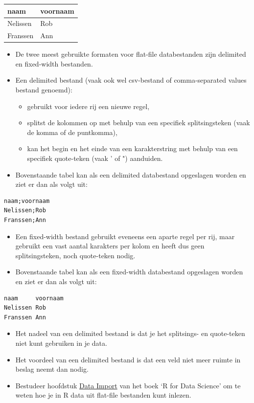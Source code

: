 \documentclass[]{tufte-book}
\providecommand{\tightlist}{%
  \setlength{\itemsep}{0pt}\setlength{\parskip}{0pt}}
\begin{document}
\begin{longtable}[]{@{}ll@{}}
\toprule
naam & voornaam\tabularnewline
\midrule
\endhead
Nelissen & Rob\tabularnewline
Franssen & Ann\tabularnewline
\bottomrule
\end{longtable}

\begin{itemize}
\tightlist
\item
  De twee meest gebruikte formaten voor flat-file databestanden zijn delimited en fixed-width bestanden.
\item
  Een delimited bestand (vaak ook wel csv-bestand of comma-separated values bestand genoemd):

  \begin{itemize}
  \tightlist
  \item
    gebruikt voor iedere rij een nieuwe regel,
  \item
    splitst de kolommen op met behulp van een specifiek splitsingsteken (vaak de komma of de puntkomma),
  \item
    kan het begin en het einde van een karakterstring met behulp van een specifiek quote-teken (vaak ' of ") aanduiden.
  \end{itemize}
\item
  Bovenstaande tabel kan als een delimited databestand opgeslagen worden en ziet er dan als volgt uit:
\end{itemize}

\begin{verbatim}
naam;voornaam
Nelissen;Rob
Franssen;Ann
\end{verbatim}

\begin{itemize}
\tightlist
\item
  Een fixed-width bestand gebruikt eveneens een aparte regel per rij, maar gebruikt een vast aantal karakters per kolom en heeft dus geen splitsingsteken, noch quote-teken nodig.
\item
  Bovenstaande tabel kan als een fixed-width databestand opgeslagen worden en ziet er dan als volgt uit:
\end{itemize}

\begin{verbatim}
naam     voornaam
Nelissen Rob
Franssen Ann
\end{verbatim}

\begin{itemize}
\tightlist
\item
  Het nadeel van een delimited bestand is dat je het splitsings- en quote-teken niet kunt gebruiken in je data.
\item
  Het voordeel van een delimited bestand is dat een veld niet meer ruimte in beslag neemt dan nodig.
\item
  Bestudeer hoofdstuk \href{http://r4ds.had.co.nz/data-import.html}{Data Import} van het boek `R for Data Science' om te weten hoe je in R data uit flat-file bestanden kunt inlezen.
\end{itemize}
\end{document}
